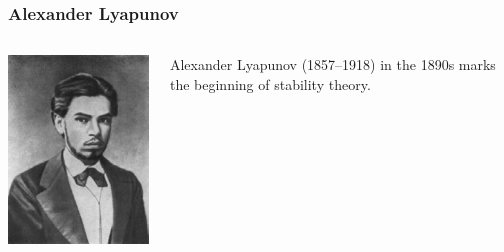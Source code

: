 \documentclass{beamer}
\begin{document}
\begin{frame}
\frametitle{Alexander Lyapunov}
\label{sec-2-6}
\begin{columns}
\begin{column}{0.3\textwidth}
\label{sec-2-6-1}

  \includegraphics[width=.9\linewidth]{image/lyapunov.png}
\end{column}
\begin{column}{0.7\textwidth}
\label{sec-2-6-2}


   Alexander Lyapunov (1857–1918) in the 1890s marks the beginning of stability theory.
\end{column}
\end{columns}
\end{frame}
\end{document}
